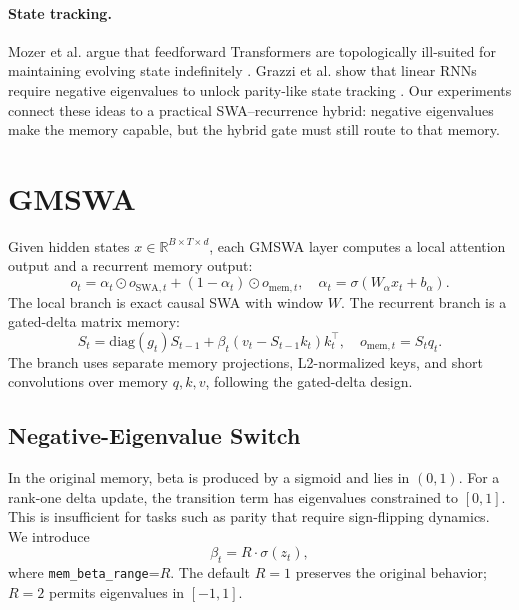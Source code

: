 \documentclass[letterpaper]{article}
\begin{document}
\paragraph{State tracking.}
Mozer et al. argue that feedforward Transformers are topologically ill-suited for maintaining evolving state indefinitely \citep{mozer2026topological}. Grazzi et al. show that linear RNNs require negative eigenvalues to unlock parity-like state tracking \citep{grazzi2024unlocking}. Our experiments connect these ideas to a practical SWA--recurrence hybrid: negative eigenvalues make the memory capable, but the hybrid gate must still route to that memory.

\section{GMSWA}

Given hidden states $x\in\mathbb{R}^{B\times T\times d}$, each GMSWA layer computes a local attention output and a recurrent memory output:
\begin{equation}
  o_t = \alpha_t \odot o_{\mathrm{SWA},t} + (1-\alpha_t)\odot o_{\mathrm{mem},t},\quad
  \alpha_t = \sigma(W_\alpha x_t + b_\alpha).
\end{equation}
The local branch is exact causal SWA with window $W$. The recurrent branch is a gated-delta matrix memory:
\begin{equation}
S_t = \mathrm{diag}(g_t)S_{t-1} + \beta_t(v_t - S_{t-1}k_t)k_t^\top,
\quad o_{\mathrm{mem},t}=S_t q_t.
\end{equation}
The branch uses separate memory projections, L2-normalized keys, and short convolutions over memory $q,k,v$, following the gated-delta design.

\subsection{Negative-Eigenvalue Switch}

In the original memory, beta is produced by a sigmoid and lies in $(0,1)$. For a rank-one delta update, the transition term has eigenvalues constrained to $[0,1]$. This is insufficient for tasks such as parity that require sign-flipping dynamics. We introduce
\begin{equation}
  \beta_t = R\cdot\sigma(z_t),
\end{equation}
where \texttt{mem\_beta\_range}=$R$. The default $R=1$ preserves the original behavior; $R=2$ permits eigenvalues in $[-1,1]$.
\end{document}
